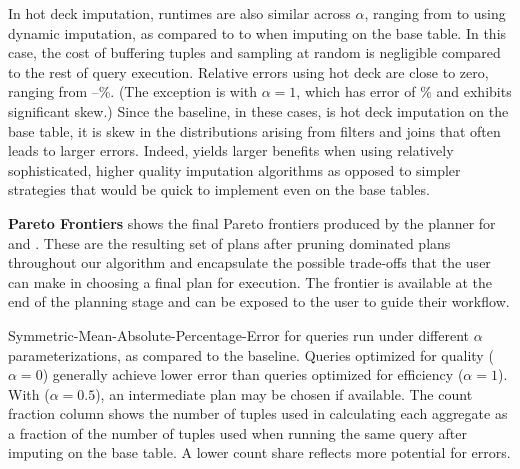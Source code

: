 {In hot deck imputation, runtimes are also similar across $\alpha$, ranging from
\runtimehotdecklow{} to \runtimehotdeckhigh{} using dynamic imputation, as compared to
\runtimehotdecklowbase{} to \runtimehotdeckhighbase{} when imputing on the base table. In
this case, the cost of buffering tuples and sampling at random is negligible compared to the
rest of query execution. Relative errors using hot deck are close to zero, ranging from
\smapehotdecklow{}--\smapehotdeckhigh{}\%. (The exception is  with $\alpha=1$, which has error
of \smapehotdeckhighoutlier{}\% and exhibits significant skew.) Since the baseline, in these
cases, is hot deck imputation on the base table, it is skew in the distributions arising from
filters and joins that often leads to larger errors. Indeed, \ProjectName{} yields
larger benefits when using relatively sophisticated, higher quality imputation algorithms as
opposed to simpler strategies that would be quick to implement even on the base tables.

\textbf{Pareto Frontiers}\quad
{} shows the final Pareto frontiers produced by the planner for  and . These are the resulting set of plans after pruning dominated plans throughout our algorithm
and encapsulate the possible trade-offs that the user can make in choosing a final plan for execution. The frontier is available at the end of the planning stage and
can be exposed to the user to guide their workflow.

\begin{table}
  \centering
  \captionsetup{labelfont=bf}
  \caption{Symmetric-Mean-Absolute-Percentage-Error for queries run under different $\alpha$ parameterizations, as compared to the baseline.
    Queries optimized
    for quality ($\alpha=0$) generally achieve lower error than queries optimized for
    efficiency ($\alpha=1$). With ($\alpha=0.5$), an intermediate plan may be chosen if
    available.
    The count fraction column shows the number of tuples used in calculating each aggregate
    as a fraction of the number of tuples used when running the same query after imputing on the base table.
    A lower count share reflects more potential for errors.}\label{table:smape}
  
\end{table}

}
